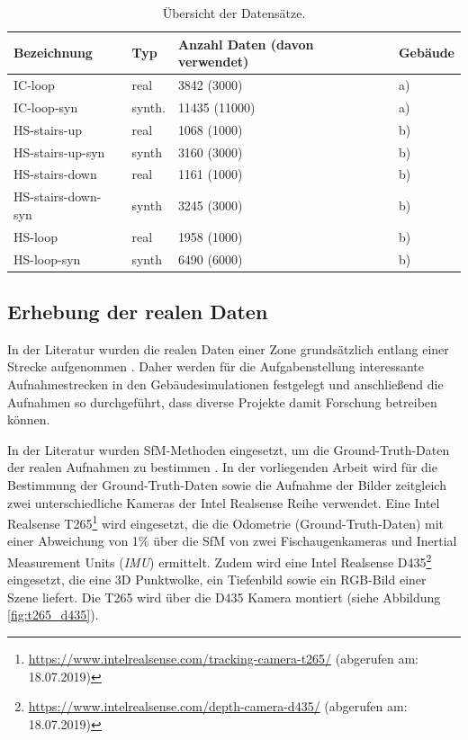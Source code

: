 \begin{table}[H]
	\centering
	\caption{Übersicht der Datensätze.}
	\begin{tabularx}{1.0\textwidth}{p{3.5cm} p{1.8cm} X  >{\centering\arraybackslash}p{1.7cm} }
		\textbf{Bezeichnung} & \textbf{Typ} & \textbf{Anzahl Daten} (davon verwendet) & \textbf{Gebäude}\\
		\hline
		IC-loop & real & 3842 (3000) & a) \\
		\hline
		IC-loop-syn & synth. & 11435 (11000) & a)\\
		\hline
		HS-stairs-up & real & 1068 (1000) & b)\\
		\hline
		HS-stairs-up-syn & synth & 3160 (3000) & b)\\
		\hline
		HS-stairs-down & real & 1161 (1000) & b)\\
		\hline
		HS-stairs-down-syn & synth &  3245 (3000) & b)\\
		\hline
		HS-loop & real & 1958 (1000) & b)\\
		\hline
		HS-loop-syn & synth &  6490 (6000) & b)\\
	\end{tabularx}
	\label{tab:datasets}
\end{table}

\cleardoublepage
\subsection{Erhebung der realen Daten}
\label{subsec:record_real_data}
In der Literatur wurden die realen Daten einer Zone grundsätzlich entlang einer Strecke aufgenommen \cite{kendallPoseNetConvolutionalNetwork2015, clarkVidLocDeepSpatioTemporal2017, acharyaBIMPoseNetIndoorCamera2019}. Daher werden für die Aufgabenstellung interessante Aufnahmestrecken in den Gebäudesimulationen festgelegt und anschließend die Aufnahmen so durchgeführt, dass diverse Projekte damit Forschung betreiben können. 

In der Literatur wurden SfM-Methoden eingesetzt, um die Ground-Truth-Daten der realen Aufnahmen zu bestimmen \cite{kendallPoseNetConvolutionalNetwork2015, clarkVidLocDeepSpatioTemporal2017, acharyaBIMPoseNetIndoorCamera2019}. 
In der vorliegenden Arbeit wird für die Bestimmung der Ground-Truth-Daten sowie die Aufnahme der Bilder zeitgleich zwei unterschiedliche Kameras der Intel Realsense Reihe verwendet. Eine Intel Realsense T265\footnote{\url{https://www.intelrealsense.com/tracking-camera-t265/} (abgerufen am: 18.07.2019)} wird eingesetzt, die die Odometrie (Ground-Truth-Daten) mit einer Abweichung von 1\%  über die SfM von zwei Fischaugenkameras und Inertial Measurement Units (\textit{IMU}) ermittelt. Zudem wird eine Intel Realsense D435\footnote{ \url{https://www.intelrealsense.com/depth-camera-d435/} (abgerufen am: 18.07.2019)} eingesetzt, die eine 3D Punktwolke, ein Tiefenbild sowie ein RGB-Bild einer Szene liefert. Die T265 wird über die D435 Kamera montiert (siehe Abbildung \ref{fig:t265_d435}). 

